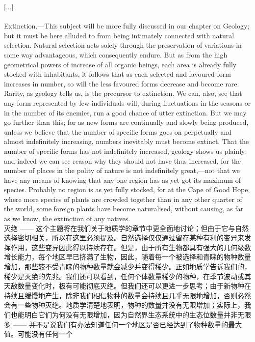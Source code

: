 \documentclass{article}
\begin{document}
[...]\\

\\
Extinction.—This subject will be more fully discussed in our chapter on Geology; but it must be here alluded to from being intimately connected with natural selection. Natural selection acts solely through the preservation of variations in some way advantageous, which consequently endure. But as from the high geometrical powers of increase of all organic beings, each area is already fully stocked with inhabitants, it follows that as each selected and favoured form increases in number, so will the less favoured forms decrease and become rare. Rarity, as geology tells us, is the precursor to extinction. We can, also, see that any form represented by few individuals will, during fluctuations in the seasons or in the number of its enemies, run a good chance of utter extinction. But we may go further than this; for as new forms are continually and slowly being produced, unless we believe that the number of specific forms goes on perpetually and almost indefinitely increasing, numbers inevitably must become extinct. That the number of specific forms has not indefinitely increased, geology shows us plainly; and indeed we can see reason why they should not have thus increased, for the number of places in the polity of nature is not indefinitely great,—not that we have any means of knowing that any one region has as yet got its maximum of species. Probably no region is as yet fully stocked, for at the Cape of Good Hope, where more species of plants are crowded together than in any other quarter of the world, some foreign plants have become naturalised, without causing, as far as we know, the extinction of any natives.\\
灭绝 —— 这个主题将在我们关于地质学的章节中更全面地讨论；但由于它与自然选择密切相关，所以在这里必须提及。自然选择仅仅通过留存某种有利的变异来发挥作用，这些变异因此得以持续存在。但是，由于所有生物都具有强大的几何级数增长能力，每个地区早已挤满了生物，因此，随着每一个被选择和青睐的物种数量增加，那些较不受青睐的物种数量就会减少并变得稀少。正如地质学告诉我们的，稀少是灭绝的先兆。我们还可以看到，任何个体数量稀少的物种，在季节波动或其天敌数量变化时，极有可能彻底灭绝。但我们还可以更进一步思考；由于新物种在持续且缓慢地产生，除非我们相信物种的数量会持续且几乎无限地增加，否则必然会有一些物种灭绝。地质学清楚地表明，物种的数量并没有无限增加；实际上，我们也能明白它们为何没有无限增加，因为自然界生态系统中的生态位数量并非无限多 —— 并不是说我们有办法知道任何一个地区是否已经达到了物种数量的最大值。可能没有任何一个\\
\end{document}
